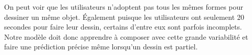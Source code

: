 On peut voir que les utilisateurs n'adoptent pas tous les mêmes formes pour dessiner un même objet. 
Également puisque les utilisateurs ont seulement 20 secondes pour faire leur dessin, certains d'entre eux sont parfois incomplets.
Notre modèle doit donc apprendre à composer avec cette grande variabilité et faire une prédiction précise même lorsqu'un dessin est partiel.

